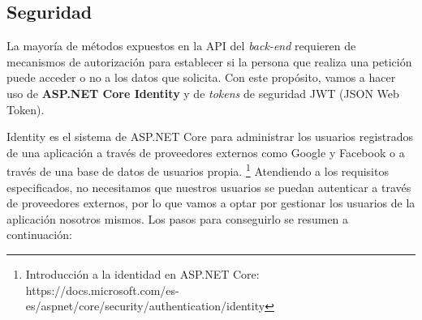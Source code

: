 \documentclass[11pt,spanish,listoffigures]{tfgetsinf}
\begin{document}
\subsection{Seguridad}

La mayoría de métodos expuestos en la API del \textit{back-end} requieren de mecanismos de autorización para establecer si la persona que realiza una petición puede acceder o no a los datos que solicita. Con este propósito, vamos a hacer uso de \textbf{ASP.NET Core Identity} y de \textit{tokens} de seguridad JWT (JSON Web Token). 

Identity es el sistema de ASP.NET Core para administrar los usuarios registrados de una aplicación a través de proveedores externos como Google y Facebook o a través de una base de datos de usuarios propia. \footnote{ Introducción a la identidad en ASP.NET Core: https://docs.microsoft.com/es-es/aspnet/core/security/authentication/identity} Atendiendo a los requisitos especificados, no necesitamos que nuestros usuarios se puedan autenticar a través de proveedores externos, por lo que vamos a optar por gestionar los usuarios de la aplicación nosotros mismos. Los pasos para conseguirlo se resumen a continuación:
\end{document}
